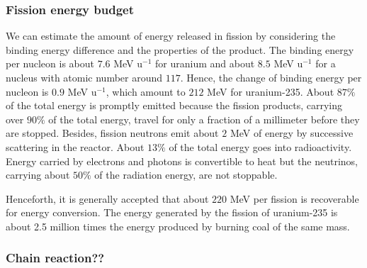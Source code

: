 \documentclass[preprint,aip,pra]{revtex4-1}
\begin{document}
        \subsubsection{Fission energy budget}
        We can estimate the amount of energy released in fission by considering the binding energy difference
        and the properties of the product.
        The binding energy per nucleon is about $7.6$ MeV u${}^{-1}$ for uranium and about $8.5$ MeV u${}^{-1}$
        for a nucleus with atomic number around $117$. Hence, the change of binding energy per nucleon is
        $0.9$ MeV u${}^{-1}$, which amount to $212$ MeV for uranium-235.
        About $87\%$ of the total energy is promptly emitted because
        the fission products, carrying over $90\%$ of the total energy, travel for only a fraction of a
        millimeter before they are stopped. Besides, fission neutrons emit about $2$ MeV of energy by
        successive scattering in the reactor.
        About $13\%$ of the total energy goes into radioactivity. Energy carried by electrons and photons is
        convertible to heat but the neutrinos, carrying about $50\%$ of the radiation energy, are not stoppable.

        Henceforth, it is generally accepted that about $220$ MeV per fission is recoverable for energy conversion.
        The energy generated by the fission of uranium-235 is 
        about 2.5 million times the energy produced by burning coal of the same mass.\cite{e17}
        \subsubsection{Chain reaction??}
\end{document}
